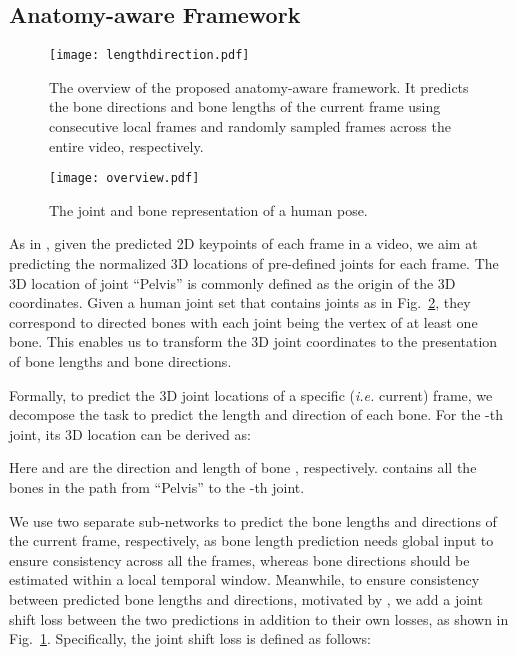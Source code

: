 \documentclass[journal]{IEEEtran}
\begin{document}
\subsection{Anatomy-aware Framework} \label{sec:lengthdirection}



\begin{figure}[!t]
\vspace{-1mm}
\centering
\texttt{[image: lengthdirection.pdf]}
\caption{The overview of the proposed anatomy-aware framework. It predicts the bone directions and bone lengths of the current frame using consecutive local frames and randomly sampled frames across the entire video, respectively.}
\vspace{-1mm}
\label{fig:ldframe}
\end{figure}

\begin{figure}[!t]
\vspace{-1mm}
\centering
\texttt{[image: overview.pdf]}
\caption{The joint and bone representation of a human pose.}
\vspace{-1mm}
\label{fig:overview}
\end{figure}





As in \cite{pavllo20193d,rayat2018exploiting,chen2019weakly}, given the predicted 2D keypoints of each frame in a video, we aim at predicting the normalized 3D locations of  pre-defined joints for each frame. The 3D location of joint ``Pelvis'' is commonly defined as the origin of the 3D coordinates. Given a human joint set that contains  joints as in Fig.~\ref{fig:overview}, they correspond to  directed bones with each joint being the vertex of at least one bone. This enables us to transform the 3D joint coordinates to the presentation of bone lengths and bone directions. 

Formally, to predict the 3D joint locations of a specific (\emph{i.e.} current) frame, we decompose the task to predict the length and direction of each bone. For the -th joint, its 3D location  can be derived as:
\vspace{-1mm}

Here  and  are the direction and length of bone , respectively.  contains all the bones in the path from ``Pelvis'' to the -th joint.

We use two separate sub-networks to predict the bone lengths and directions of the current frame, respectively, as bone length prediction needs global input to ensure consistency across all the frames, whereas bone directions should be estimated within a local temporal window. Meanwhile, to ensure consistency between predicted bone lengths and directions, motivated by \cite{sun2017compositional}, we add a joint shift loss between the two predictions in addition to their own losses, as shown in Fig.~\ref{fig:ldframe}. Specifically, the joint shift loss is defined as follows:
\vspace{-1mm}
\end{document}
